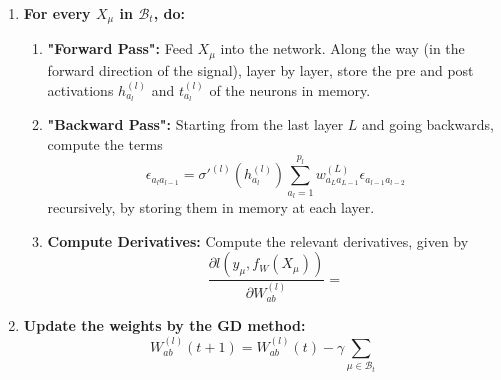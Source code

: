 \documentclass{article}
\begin{document}
\begin{enumerate}
    \item \textbf{For every $X_{\mu}$ in $\mathcal{B}_t$, do:}
    \begin{enumerate}
        \item \textbf{"Forward Pass":}
        Feed $X_{\mu}$ into the network. Along the way (in the forward direction of the signal), layer by layer, store the pre and post activations $h^{(l)}_{a_l}$ and $t^{(l)}_{a_l}$ of the neurons in memory.
        \item \textbf{"Backward Pass":}
        Starting from the last layer $L$ and going backwards, compute the terms
        \begin{equation}
            \epsilon_{a_{l} a_{l-1}}
            =
            \sigma'^{(l)} (h^{(l)}_{a_l})
            \sum_{a_l=1}^{p_l}
            w^{(L)}_{a_L a_{L-1}}
            \epsilon_{a_{l-1} a_{l-2}}
        \end{equation}
        recursively, by storing them in memory at each layer.
        \item \textbf{Compute Derivatives:}
        Compute the relevant derivatives, given by
        \begin{equation}
            \frac{\partial l(y_{\mu}, f_W(X_{\mu}))}{\partial W^{(l)}_{a b}}
            =
        \end{equation}
    \end{enumerate}
    \item \textbf{Update the weights by the GD method:}
    \begin{equation}
        W^{(l)}_{a b} (t+1)
            =
            W^{(l)}_{a b} (t)
            - \gamma \sum_{\mu \in \mathcal{B}_t}
    \end{equation}
\end{enumerate}
\end{document}
